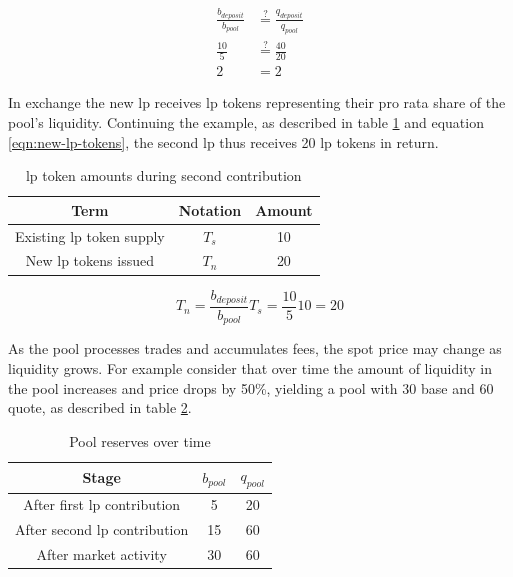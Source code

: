 \documentclass[table, twocolumn]{article}
\begin{document}
\begin{align} \label{eqn:new-lp-base-quote-ratios}
  \frac{b_{deposit}}{b_{pool}} & \stackrel{?}{=} \frac{q_{deposit}}{q_{pool}} \nonumber \\
  \frac{10}{5}                 & \stackrel{?}{=} \frac{40}{20}  \nonumber               \\
  2                            & = 2
\end{align}

In exchange the new \gls{lp} receives \gls{lp} tokens representing their pro rata share of the
pool's liquidity. Continuing the example, as described in table \ref{tab:new-lp-tokens} and equation
\ref{eqn:new-lp-tokens}, the second \gls{lp} thus receives 20 \gls{lp} tokens in return.

\begin{table}[!htb]
  \centering
  \begin{tabular}{|c|c|c|}
    \hline \rowcolor{blue}
    Term                           & Notation & Amount \\ \hline
    Existing \gls{lp} token supply & $T_s$    & 10     \\ \hline
    New \gls{lp} tokens issued     & $T_n$    & 20     \\ \hline
  \end{tabular}
  \caption{\gls{lp} token amounts during second contribution}
  \label{tab:new-lp-tokens}
\end{table}

\begin{equation} \label{eqn:new-lp-tokens}
  T_n = \frac{b_{deposit}}{b_{pool}} T_s = \frac{10}{5} 10 = 20
\end{equation}

As the pool processes trades and accumulates fees, the spot price may change as liquidity grows.
For example consider that over time the amount of liquidity in the pool increases and price drops by
50\%, yielding a pool with 30 base and 60 quote, as described in table
\ref{tab:pool-reserve-progression}.

\begin{table}[!htb]
  \centering
  \begin{tabular}{|c|c|c|}
    \hline \rowcolor{blue}
    Stage                              & $b_{pool}$ & $q_{pool}$ \\ \hline
    After first \gls{lp} contribution  & 5          & 20         \\ \hline
    After second \gls{lp} contribution & 15         & 60         \\ \hline
    After market activity              & 30         & 60         \\ \hline
  \end{tabular}
  \caption{Pool reserves over time}
  \label{tab:pool-reserve-progression}
\end{table}
\end{document}

